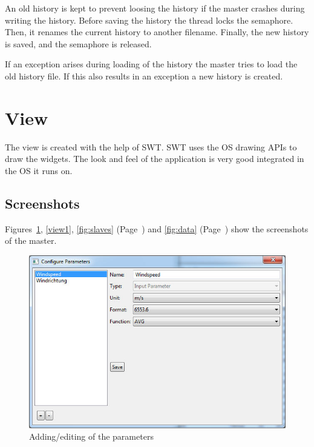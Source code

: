 An old history is kept to prevent loosing the history if the master crashes during writing the history. Before saving the history the thread locks the semaphore. Then, it renames the current history to another filename. Finally, the new history is saved, and the semaphore is released.

If an exception arises during loading of the history the master tries to load the old history file. If this also results in an exception a new history is created.

\section{View} %
\label{sec:view}

The view is created with the help of SWT. SWT uses the OS drawing APIs to draw the widgets. The look and feel of the application is very good integrated in the OS it runs on. 

\subsection{Screenshots} %
\label{sub:screenshots}
Figures~\ref{fig:parameter}, \ref{view1}, \ref{fig:slaves} (Page~\pageref{fig:slaves}) and \ref{fig:data} (Page~\pageref{fig:data}) show the screenshots of the master.

\begin{figure}[ht]
    \centering
    \includegraphics[width=\linewidth]{master/parameters.jpg}
    \caption{Adding/editing of the parameters}
    \label{fig:parameter}
\end{figure} 

